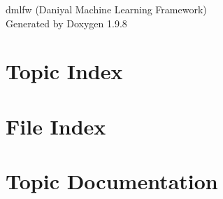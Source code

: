 \documentclass[twoside]{book}
\newcommand{\+}{\discretionary{\mbox{\scriptsize$\hookleftarrow$}}{}{}}
\newcommand{\clearemptydoublepage}{%
    \newpage{\pagestyle{empty}\cleardoublepage}%
  }
\begin{document}
  \raggedbottom
    \hypersetup{pageanchor=false,
                bookmarksnumbered=true,
                pdfencoding=unicode
               }
  \begin{titlepage}
  \vspace*{7cm}
  \begin{center}%
  {\Large dmlfw (\+Daniyal Machine Learning Framework)}\\
  \vspace*{1cm}
  {\large Generated by Doxygen 1.9.8}\\
  \end{center}
  \end{titlepage}
  \clearemptydoublepage
  \tableofcontents
  \clearemptydoublepage
  \hypersetup{pageanchor=true}

\chapter{Topic Index}

\chapter{File Index}

\chapter{Topic Documentation}



\end{document}
